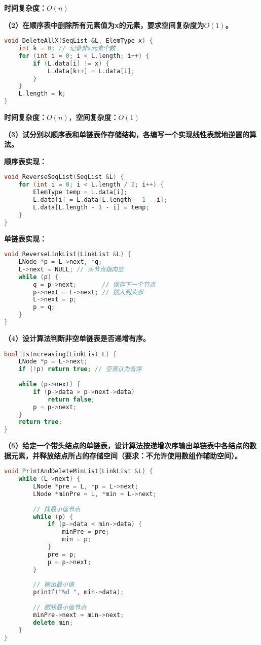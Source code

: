 \documentclass[12pt,a4paper]{amsart}
\begin{document}
\textbf{时间复杂度：}$O(n)$

\textbf{（2）在顺序表中删除所有元素值为x的元素，要求空间复杂度为$O(1)$。}

\begin{lstlisting}[language=C++]
void DeleteAllX(SeqList &L, ElemType x) {
    int k = 0; // 记录非x元素个数
    for (int i = 0; i < L.length; i++) {
        if (L.data[i] != x) {
            L.data[k++] = L.data[i];
        }
    }
    L.length = k;
}
\end{lstlisting}

\textbf{时间复杂度：}$O(n)$，\textbf{空间复杂度：}$O(1)$

\textbf{（3）试分别以顺序表和单链表作存储结构，各编写一个实现线性表就地逆置的算法。}

\textbf{顺序表实现：}
\begin{lstlisting}[language=C++]
void ReverseSeqList(SeqList &L) {
    for (int i = 0; i < L.length / 2; i++) {
        ElemType temp = L.data[i];
        L.data[i] = L.data[L.length - 1 - i];
        L.data[L.length - 1 - i] = temp;
    }
}
\end{lstlisting}

\textbf{单链表实现：}
\begin{lstlisting}[language=C++]
void ReverseLinkList(LinkList &L) {
    LNode *p = L->next, *q;
    L->next = NULL; // 头节点指向空
    while (p) {
        q = p->next;       // 保存下一个节点
        p->next = L->next; // 插入到头部
        L->next = p;
        p = q;
    }
}
\end{lstlisting}

\textbf{（4）设计算法判断非空单链表是否递增有序。}

\begin{lstlisting}[language=C++]
bool IsIncreasing(LinkList L) {
    LNode *p = L->next;
    if (!p) return true; // 空表认为有序
    
    while (p->next) {
        if (p->data > p->next->data)
            return false;
        p = p->next;
    }
    return true;
}
\end{lstlisting}

\textbf{（5）给定一个带头结点的单链表，设计算法按递增次序输出单链表中各结点的数据元素，并释放结点所占的存储空间（要求：不允许使用数组作辅助空间）。}

\begin{lstlisting}[language=C++]
void PrintAndDeleteMinList(LinkList &L) {
    while (L->next) {
        LNode *pre = L, *p = L->next;
        LNode *minPre = L, *min = L->next;
        
        // 找最小值节点
        while (p) {
            if (p->data < min->data) {
                minPre = pre;
                min = p;
            }
            pre = p;
            p = p->next;
        }
        
        // 输出最小值
        printf("%d ", min->data);
        
        // 删除最小值节点
        minPre->next = min->next;
        delete min;
    }
}
\end{lstlisting}
\end{document}
